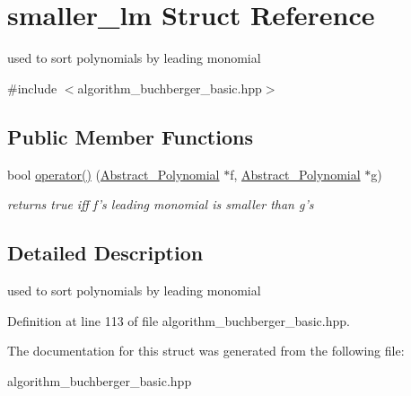 \hypertarget{structsmaller__lm}{}\section{smaller\+\_\+lm Struct Reference}
\label{structsmaller__lm}


used to sort polynomials by leading monomial  




{\ttfamily \#include $<$algorithm\+\_\+buchberger\+\_\+basic.\+hpp$>$}

\subsection*{Public Member Functions}
\begin{DoxyCompactItemize}
\item 
\mbox{\label{structsmaller__lm_a683ffd0302d029cd21c5bafdf4335785}} 
bool \hyperlink{structsmaller__lm_a683ffd0302d029cd21c5bafdf4335785}{operator()} (\hyperlink{class_abstract___polynomial}{Abstract\+\_\+\+Polynomial} $\ast$f, \hyperlink{class_abstract___polynomial}{Abstract\+\_\+\+Polynomial} $\ast$g)
\begin{DoxyCompactList}\small\item\em returns {\ttfamily true} iff {\ttfamily f's} leading monomial is smaller than {\ttfamily g's} \end{DoxyCompactList}\end{DoxyCompactItemize}


\subsection{Detailed Description}
used to sort polynomials by leading monomial 

Definition at line 113 of file algorithm\+\_\+buchberger\+\_\+basic.\+hpp.



The documentation for this struct was generated from the following file\+:\begin{DoxyCompactItemize}
\item 
algorithm\+\_\+buchberger\+\_\+basic.\+hpp\end{DoxyCompactItemize}
